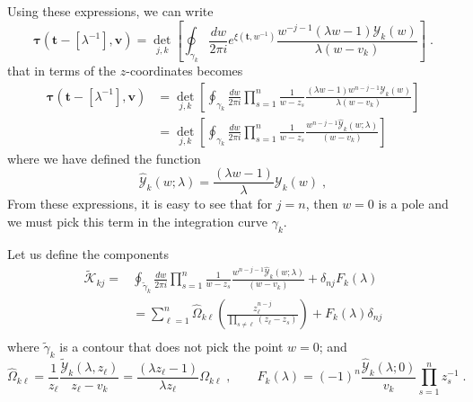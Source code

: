 \documentclass[a4paper,11pt]{amsart}
\begin{document}
Using these expressions, we can write 
\begin{equation}
  \bm{\tau}(\bm{t} - [\lambda^{-1}], \bm{v}) =
  \det_{j,k}\left[
  \oint_{\gamma_k} \frac{dw}{2\pi i} e^{\xi(\bm{t}, w^{-1})} \frac{w^{- j -1} ( \lambda w - 1) \mathcal{Y}_k(w)}{\lambda(w - v_k)} 
  \right]\; .
\end{equation}
that in terms of the \(z\)-coordinates becomes
\begin{equation}
\begin{split}
  \bm{\tau}(\bm{t} - [\lambda^{-1}], \bm{v})
  & = \det_{j,k}\left[\oint_{\gamma_k} \frac{dw}{2\pi i} \prod_{s=1}^n \frac{1}{w - z_s}  
    \frac{( \lambda w - 1) w^{n-j-1}\mathcal{Y}_k(w)}{\lambda(w - v_k)} \right]\\
  & = \det_{j,k}\left[
    \oint_{\gamma_k} \frac{dw}{2\pi i} \prod_{s=1}^n \frac{1}{w - z_s}  
    \frac{w^{n-j-1}\widehat{\mathcal{Y}}_k(w; \lambda)}{(w - v_k)}
    \right]
\end{split}
\end{equation}
where we have defined the function 
\begin{equation}
  \widehat{\mathcal{Y}}_k(w; \lambda)
  = \frac{( \lambda w - 1)}{\lambda} \mathcal{Y}_k(w) \; ,
\end{equation}
From these expressions, it is easy to see that for \(j=n\), then \(w =
0\) is a pole and we must pick this term in the integration curve
\(\gamma_k\).

Let us define the components
\begin{equation}
  \begin{split}
    \widetilde{\mathcal{K}}_{kj} = &
    \oint_{\tilde \gamma_k} \frac{dw}{2\pi i} \prod_{s=1}^n \frac{1}{w - z_s}
    \frac{w^{n-j-1}\widehat{\mathcal{Y}}_k(w; \lambda)}{(w - v_k)}
    + \delta_{nj} F_k(\lambda) \\
    & = \sum_{\ell = 1}^n  \widehat{\Omega}_{k \ell} \left( \frac{z_\ell^{n-j}}{\prod_{s\neq \ell} (z_\ell - z_s)} \right)
    + F_k(\lambda)\delta_{nj}  \\
  \end{split}
\end{equation}
where \(\tilde{\gamma}_k\) is a contour that does not pick
the point \(w=0\); and
\begin{equation}
  \widehat{\Omega}_{k\ell}
  = \frac{1}{z_\ell} \frac{\widetilde{\mathcal{Y}}_k(\lambda, z_\ell)}{z_\ell - v_k}
  = \frac{(\lambda z_\ell -1)}{\lambda z_\ell} {\Omega}_{k\ell} 
\; , \qquad 
 F_k(\lambda) = (-1)^n \frac{\widehat{\mathcal{Y}}_k(\lambda; 0)}{v_k }  \prod_{s=1}^n z_s^{-1} \; .
\end{equation}
\end{document}
